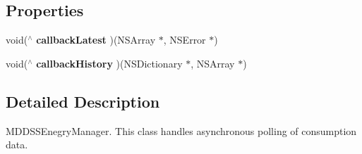 \subsection*{Properties}
\begin{DoxyCompactItemize}
\item 
\hypertarget{interface_m_d_d_s_s_consumption_manager_a911f8a05a99ca741b5e36c59bab6f85f}{void($^\wedge$ {\bfseries callback\-Latest} )(N\-S\-Array $\ast$, N\-S\-Error $\ast$)}\label{interface_m_d_d_s_s_consumption_manager_a911f8a05a99ca741b5e36c59bab6f85f}

\item 
\hypertarget{interface_m_d_d_s_s_consumption_manager_a710c4c8abe3ecfb0555ae66cd7c0d938}{void($^\wedge$ {\bfseries callback\-History} )(N\-S\-Dictionary $\ast$, N\-S\-Array $\ast$)}\label{interface_m_d_d_s_s_consumption_manager_a710c4c8abe3ecfb0555ae66cd7c0d938}

\end{DoxyCompactItemize}


\subsection{Detailed Description}
M\-D\-D\-S\-S\-Enegry\-Manager. This class handles asynchronous polling of consumption data. 

